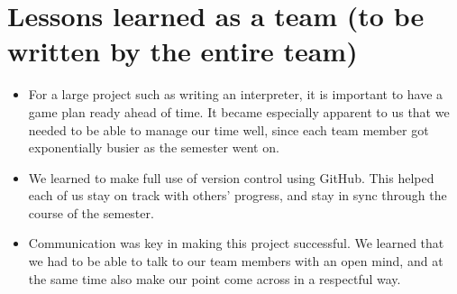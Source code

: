 
\section{Lessons learned as a team (to be written by the entire team)}
\begin{itemize}
\item For a large project such as writing an interpreter, it is important to have a game plan ready ahead of time. It became especially apparent to us that we needed to be able to manage our time well, since each team member got exponentially busier as the semester went on. 
\item We learned to make full use of version control using GitHub. This helped each of us stay on track with others' progress, and stay in sync through the course of the semester.
\item Communication was key in making this project successful. We learned that we had to be able to talk to our team members with an open mind, and at the same time also make our point come across in a respectful way.
\end{itemize}


